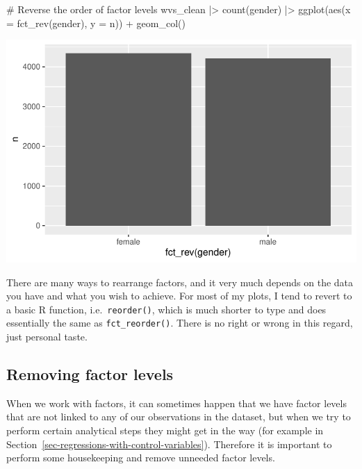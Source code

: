 \documentclass[
  letterpaper,
]{krantz}
\makeatletter
\newenvironment{Shaded}{\begin{snugshade}}{\end{snugshade}}
\newcommand{\AttributeTok}[1]{\textcolor[rgb]{0.40,0.45,0.13}{#1}}
\newcommand{\CommentTok}[1]{\textcolor[rgb]{0.37,0.37,0.37}{#1}}
\newcommand{\FunctionTok}[1]{\textcolor[rgb]{0.28,0.35,0.67}{#1}}
\newcommand{\NormalTok}[1]{\textcolor[rgb]{0.00,0.23,0.31}{#1}}
\newcommand{\SpecialCharTok}[1]{\textcolor[rgb]{0.37,0.37,0.37}{#1}}
\newenvironment{kframe}{%
\medskip{}
\setlength{\fboxsep}{.8em}
 \def\at@end@of@kframe{}%
 \ifinner\ifhmode%
  \def\at@end@of@kframe{\end{minipage}}%
  \begin{minipage}{\columnwidth}%
 \fi\fi%
 \def\FrameCommand##1{\hskip\@totalleftmargin \hskip-\fboxsep
 \colorbox{shadecolor}{##1}\hskip-\fboxsep
     \hskip-\linewidth \hskip-\@totalleftmargin \hskip\columnwidth}%
 \MakeFramed {\advance\hsize-\width
   \@totalleftmargin\z@ \linewidth\hsize
   \@setminipage}}%
 {\par\unskip\endMakeFramed%
 \at@end@of@kframe}
\renewenvironment{Shaded}{\begin{kframe}}{\end{kframe}}
\makeatother
\begin{document}
\begin{Shaded}
\begin{Highlighting}[]
\CommentTok{\# Reverse the order of factor levels}
\NormalTok{wvs\_clean }\SpecialCharTok{|\textgreater{}}
  \FunctionTok{count}\NormalTok{(gender) }\SpecialCharTok{|\textgreater{}}
  \FunctionTok{ggplot}\NormalTok{(}\FunctionTok{aes}\NormalTok{(}\AttributeTok{x =} \FunctionTok{fct\_rev}\NormalTok{(gender),}
             \AttributeTok{y =}\NormalTok{ n)) }\SpecialCharTok{+}
  \FunctionTok{geom\_col}\NormalTok{()}
\end{Highlighting}
\end{Shaded}

\includegraphics{07_data_wrangling_files/figure-pdf/reverse-order-1.pdf}

There are many ways to rearrange factors, and it very much depends on
the data you have and what you wish to achieve. For most of my plots, I
tend to revert to a basic R function, i.e.~\texttt{reorder()}, which is
much shorter to type and does essentially the same as
\texttt{fct\_reorder()}. There is no right or wrong in this regard, just
personal taste.

\subsection{Removing factor levels}\label{sec-removing-factor-levels}

When we work with factors, it can sometimes happen that we have factor
levels that are not linked to any of our observations in the dataset,
but when we try to perform certain analytical steps they might get in
the way (for example in
Section~\ref{sec-regressions-with-control-variables}). Therefore it is
important to perform some housekeeping and remove unneeded factor
levels.
\end{document}
